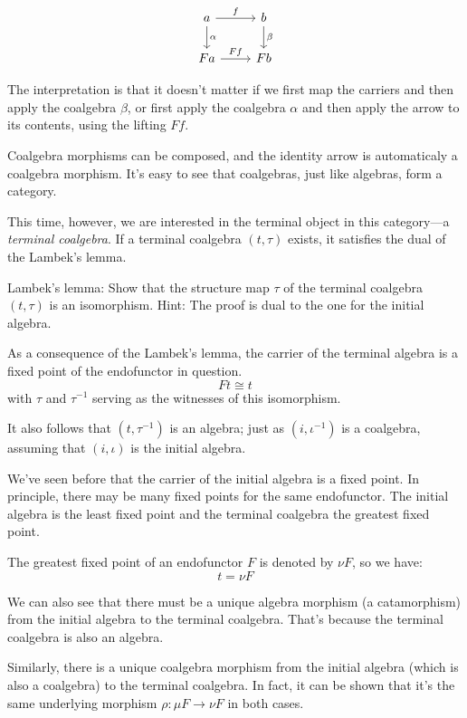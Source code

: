 \documentclass[DaoFP]{subfiles}
\begin{document}
\[
 \begin{tikzcd}
 a 
 \arrow[r, "f"]
 \arrow[d, "\alpha"]
 & b
\arrow[d, "\beta"]
 \\
F  a
 \arrow[r, "F f"]
 & F b
  \end{tikzcd}
\]

The interpretation is that it doesn't matter if we first map the carriers and then apply the coalgebra $\beta$, or first apply the coalgebra $\alpha$ and then apply the arrow to its contents, using the lifting $F f$.

Coalgebra morphisms can be composed, and the identity arrow is automaticaly a coalgebra morphism. It's easy to see that coalgebras, just like algebras, form a category. 

This time, however, we are interested in the terminal object in this category---a \emph{terminal coalgebra}. If a terminal coalgebra $(t, \tau)$ exists, it satisfies the dual of the Lambek's lemma. 

\begin{exercise}{Lambek's lemma:}
Show that the structure map $\tau$ of the terminal coalgebra $(t, \tau)$ is an isomorphism. Hint: The proof is dual to the one for the initial algebra.
\end{exercise}

As a consequence of the Lambek's lemma, the carrier of the terminal algebra is a fixed point of the endofunctor in question. 
\[ F t \cong t \]
with $\tau$ and $\tau^{-1}$ serving as the witnesses of this isomorphism. 

It also follows that $(t, \tau^{-1})$ is an algebra; just as  $(i, \iota^{-1})$ is a coalgebra, assuming that $(i, \iota)$ is the initial algebra.

We've seen before that the carrier of the initial algebra is a fixed point. In principle, there may be many fixed points for the same endofunctor. The initial algebra is the least fixed point and the terminal coalgebra the greatest fixed point. 

The greatest fixed point of an endofunctor $F$ is denoted by $\nu F$, so we have:
\[ t = \nu F \]

We can also see that there must be a unique algebra morphism (a catamorphism) from the initial algebra to the terminal coalgebra. That's because the terminal coalgebra is also an algebra. 

Similarly, there is a unique coalgebra morphism from the initial algebra (which is also a coalgebra) to the terminal coalgebra. In fact, it can be shown that it's the same underlying morphism $\rho \colon \mu F \to \nu F$ in both cases. 
\end{document}
